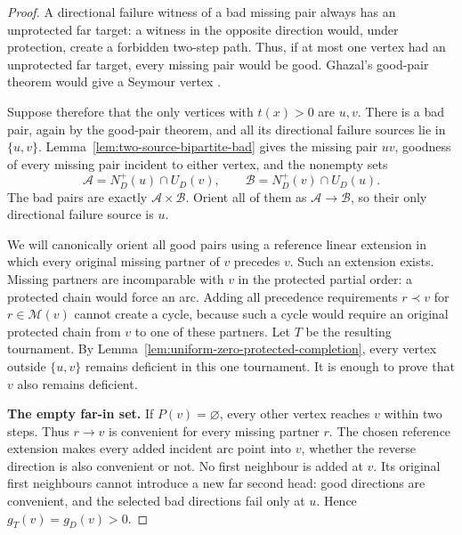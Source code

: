 \begin{proof}
A directional failure witness of a bad missing pair always has an
unprotected far target: a witness in the opposite direction would,
under protection, create a forbidden two-step path. Thus, if at most
one vertex had an unprotected far target, every missing pair would
be good. Ghazal's good-pair theorem would give a Seymour vertex
\cite[Theorem~2]{Ghazal2012}.

Suppose therefore that the only vertices with $t(x)>0$ are $u,v$.
There is a bad pair, again by the good-pair theorem, and all its
directional failure sources lie in $\{u,v\}$.
Lemma~\ref{lem:two-source-bipartite-bad} gives the missing pair $uv$,
goodness of every missing pair incident to either vertex, and the
nonempty sets
\[
 \mathcal A=N_D^+(u)\cap U_D(v),\qquad
 \mathcal B=N_D^+(v)\cap U_D(u).
\]
The bad pairs are exactly $\mathcal A\times\mathcal B$.
Orient all of them as $\mathcal A\to\mathcal B$, so their only
directional failure source is $u$.

We will canonically orient all good pairs using a reference linear
extension in which every original missing partner of $v$ precedes $v$.
Such an extension exists. Missing partners are incomparable with $v$
in the protected partial order: a protected chain would force an arc.
Adding all precedence requirements $r\prec v$ for
$r\in\mathcal M(v)$ cannot create a cycle, because such a cycle would
require an original protected chain from $v$ to one of these partners.
Let $T$ be the resulting tournament.
By Lemma~\ref{lem:uniform-zero-protected-completion}, every vertex
outside $\{u,v\}$ remains deficient in this one tournament. It is
enough to prove that $v$ also remains deficient.

\par\medskip\noindent\textbf{The empty far-in set.}\quad 
If $P(v)=\varnothing$, every other vertex reaches $v$ within two
steps. Thus $r\to v$ is convenient for every missing partner $r$.
The chosen reference extension makes every added incident arc point
into $v$, whether the reverse direction is also convenient or not.
No first neighbour is added at $v$. Its original first neighbours
cannot introduce a new far second head: good directions are convenient,
and the selected bad directions fail only at $u$.
Hence $g_T(v)=g_D(v)>0$.


\end{proof}
